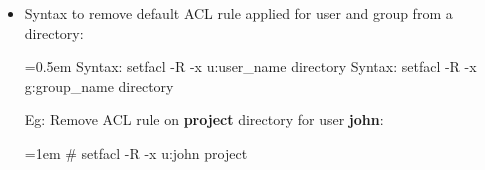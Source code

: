 \begin{flushleft}
\begin{itemize}
\begin{itemize}
\bigskip
\bigskip

	\item Syntax to remove default ACL rule applied for user and group from a directory:
	\bigskip
	\begin{tcolorbox}[breakable,notitle,boxrule=-0pt,colback=pink,colframe=pink]
		\color{black}
		\font=0.5em
		Syntax: setfacl -R -x u:user\_name directory
		\newline
		Syntax: setfacl -R -x g:group\_name directory
		\font=4pt
	\end{tcolorbox}
	Eg: Remove ACL rule on \textbf{project} directory for user \textbf{john}:
	\bigskip
	\begin{tcolorbox}[breakable,notitle,boxrule=-0pt,colback=black,colframe=black]
		\color{green}
		\font=1em
		\# setfacl -R -x u:john project
		\font=4pt
	\end{tcolorbox}
	
	
\end{itemize}




\end{itemize}



	
\end{flushleft}

\newpage

